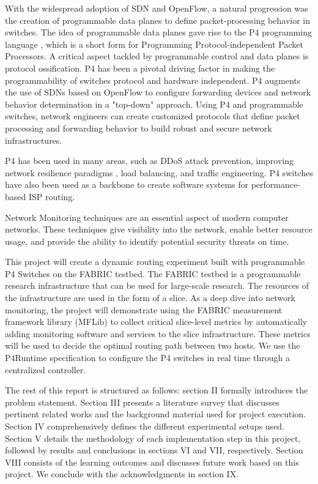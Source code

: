\documentclass[conference]{IEEEtran}
\begin{document}
    With the widespread adoption of SDN and OpenFlow, a natural progression was the creation of programmable data planes to define packet-processing behavior in switches. The idea of programmable data planes gave rise to the P4 programming language \cite{b1}, which is a short form for Programming Protocol-independent Packet Processors. A critical aspect tackled by programmable control and data planes is protocol ossification. P4 has been a pivotal driving factor in making the programmability of switches protocol and hardware independent. P4 augments the use of SDNs based on OpenFlow to configure forwarding devices and network behavior determination in a "top-down" approach. Using P4 and programmable switches, network engineers can create customized protocols that define packet processing and forwarding behavior to build robust and secure network infrastructures.
     
    P4 has been used in many areas, such as DDoS attack prevention, improving network resilience paradigms \cite{b2}, load balancing, and traffic engineering. P4 switches have also been used as a backbone to create software systems for performance-based ISP routing.
    
    Network Monitoring techniques are an essential aspect of modern computer networks. These techniques give visibility into the network, enable better resource usage, and provide the ability to identify potential security threats on time.
     
    This project will create a dynamic routing experiment built with programmable P4 Switches on the FABRIC testbed. The FABRIC testbed is a programmable research infrastructure that can be used for large-scale research. The resources of the infrastructure are used in the form of a slice. As a deep dive into network monitoring, the project will demonstrate using the FABRIC measurement framework library (MFLib) \cite{b4} to collect critical slice-level metrics by automatically adding monitoring software and services to the slice infrastructure. These metrics will be used to decide the optimal routing path between two hosts. We use the P4Runtime specification to configure the P4 switches in real time through a centralized controller.
    
    The rest of this report is structured as follows: section II formally introduces the problem statement. Section III presents a literature survey that discusses pertinent related works and the background material used for project execution. Section IV comprehensively defines the different experimental setups used. Section V details the methodology of each implementation step in this project, followed by results and conclusions in sections VI and VII, respectively. Section VIII consists of the learning outcomes and discusses future work based on this project. We conclude with the acknowledgments in section IX.
\end{document}
